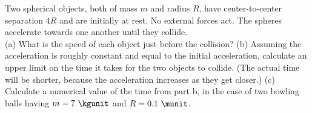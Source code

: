 Two spherical objects, both of mass $m$ and radius $R$, have
center-to-center separation $4R$ and are initially at rest. No external 
forces act. The
spheres accelerate towards one another until they collide.\\
%
(a) What is the speed of each object just before the collision?\answercheck\hwendpart
%
(b) Assuming the acceleration is roughly constant and equal to the
initial acceleration, calculate an upper limit on the time it takes
for the two objects to collide. (The actual time will be shorter,
because the acceleration increases as they get closer.)\answercheck\hwendpart
%
(c) Calculate a numerical value of the time from part b, in the
case of two bowling balls having $m = 7\ \kgunit$ and $R = 0.1\ \munit$.\answercheck\hwendpart
